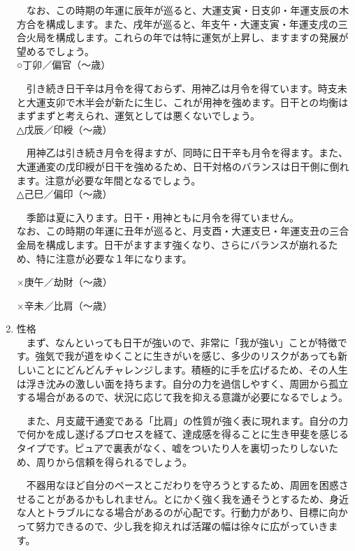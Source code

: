 \documentclass[a5paper,11pt,dvipdfmx]{tarticle}
\begin{document}
\begin{enumerate}
　なお、この時期の年運に辰年が巡ると、大運支寅・日支卯・年運支辰の木方合を構成します。また、戌年が巡ると、年支午・大運支寅・年運支戌の三合火局を構成します。これらの年では特に運気が上昇し、ますますの発展が望めるでしょう。\\

○丁卯／偏官（〜歳）

　引き続き日干辛は月令を得ておらず、用神乙は月令を得ています。時支未と大運支卯で木半会が新たに生じ、これが用神を強めます。日干との均衡はまずまずと考えられ、運気としては悪くないでしょう。\\

△戊辰／印綬（〜歳）

　用神乙は引き続き月令を得ますが、同時に日干辛も月令を得ます。また、大運通変の戊印綬が日干を強めるため、日干対格のバランスは日干側に倒れます。注意が必要な年間となるでしょう。\\

△己巳／偏印（〜歳）

　季節は夏に入ります。日干・用神ともに月令を得ていません。\\


なお、この時期の年運に丑年が巡ると、月支酉・大運支巳・年運支丑の三合金局を構成します。日干がますます強くなり、さらにバランスが崩れるため、特に注意が必要な１年になります。


×庚午／劫財（〜歳）

×辛未／比肩（〜歳）


\item 性格\\
  　まず、なんといっても日干が強いので、非常に「我が強い」ことが特徴です。強気で我が道をゆくことに生きがいを感じ、多少のリスクがあっても新しいことにどんどんチャレンジします。積極的に手を広げるため、その人生は浮き沈みの激しい面を持ちます。自分の力を過信しやすく、周囲から孤立する場合があるので、状況に応じて我を抑える意識が必要になるでしょう。
  
  　また、月支蔵干通変である「比肩」の性質が強く表に現れます。自分の力で何かを成し遂げるプロセスを経て、達成感を得ることに生き甲斐を感じるタイプです。ピュアで裏表がなく、嘘をついたり人を裏切ったりしないため、周りから信頼を得られるでしょう。
  
  　不器用なほど自分のペースとこだわりを守ろうとするため、周囲を困惑させることがあるかもしれません。とにかく強く我を通そうとするため、身近な人とトラブルになる場合があるのが心配です。行動力があり、目標に向かって努力できるので、少し我を抑えれば活躍の幅は徐々に広がっていきます。
  

\end{enumerate}
\end{document}
